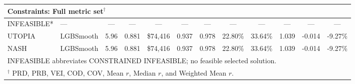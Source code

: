 \documentclass[12pt, draft]{article}
\theoremstyle{plain}
\theoremstyle{definition}
\newcommand{\1}{\mathbf{1}}
\begin{document}
{\begin{table}[!htbp]
{\begin{tabular}{llc|cc|cc|cc|ccc}
\multicolumn{12}{l}{\textbf{Constraints: Full metric set$^\dagger$}} \\
\midrule
INFEASIBLE* & --- & --- & --- & --- & --- & --- & --- & --- & --- & --- & --- \\
UTOPIA & LGBSmooth & 5.96 & 0.881 & \$74{,}416 & 0.937 & 0.978 & 22.80\% & 33.64\% & 1.039 & -0.014 & -9.27\% \\
NASH & LGBSmooth & 5.96 & 0.881 & \$74{,}416 & 0.937 & 0.978 & 22.80\% & 33.64\% & 1.039 & -0.014 & -9.27\% \\
\bottomrule
\multicolumn{12}{l}{\footnotesize *INFEASIBLE abbreviates CONSTRAINED INFEASIBLE; no feasible selected solution.} \\
\multicolumn{12}{l}{\footnotesize $^\dagger$ PRD, PRB, VEI, COD, COV, Mean $r$, Median $r$, and Weighted Mean $r$.}
\end{tabular}}
\end{table}



}
\end{document}
